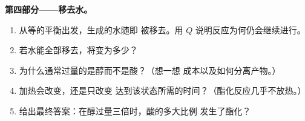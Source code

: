 \begin{problem}
\medskip
\noindent\textbf{第四部分——移去水。}
\begin{enumerate}[resume]
  \item 从等的平衡出发，生成的水随即
        被移去。用 $Q$ 说明反应为何仍会继续进行。
  \item 若水能全部移去，将变为多少？
  \item 为什么通常过量的是醇而不是酸？（想一想
        成本以及如何分离产物。）
  \item 加热会改变，还是只改变
        达到该状态所需的时间？（酯化反应几乎不放热。）
  \item 给出最终答案：在醇过量三倍时，酸的多大比例
        发生了酯化？
\end{enumerate}
\end{problem}
